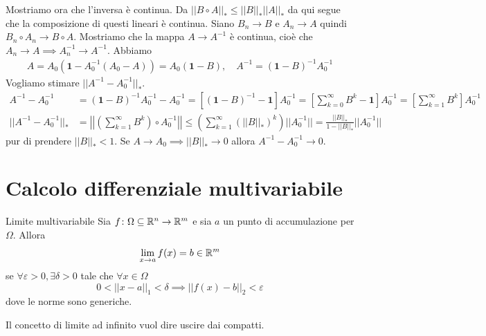 \documentclass[a4paper]{article}
\begin{document}
\begin{snippetproof}{}
    Mostriamo ora che l'inversa è continua.
    Da \(||B\circ A||_* \leq ||B||_* ||A||_*\)
    da qui segue che la composizione di questi lineari è continua.
    Siano \(B_n \to B\) e \(A_n \to A\) quindi \(B_n \circ A_n \to B\circ A\).
    Mostriamo che la mappa \(A \to A^{-1}\) è continua, cioè che
    \(A_n \to A \implies A_n^{-1} \to A^{-1}\). Abbiamo
    \begin{align*}
        A = A_0(\mathbf{1} - A_0^{-1}(A_0 - A)) = A_0(\mathbf{1} - B), \quad A^{-1} = (\mathbf{1} - B)^{-1} A_0^{-1}
    \end{align*}
    Vogliamo stimare \(||A^{-1} - A_0^{-1}||_*\).
    \begin{align*}
        A^{-1} - A_0^{-1} &=
        {(\mathbf{1} - B)}^{-1} A_0^{-1} - A_0^{-1}
        = \left[
            {(\mathbf{1} - B)}^{-1} - \mathbf{1}
        \right]A_0^{-1} = \left[
            \sum_{k=0}^\infty B^k - \mathbf{1}
        \right]A_0^{-1} = \left[\sum_{k=1}^\infty B^k\right] A_0^{-1} \\
        ||A^{-1} - A_0^{-1}||_*
        &= \left|\left| \left(\sum_{k=1}^\infty B^k\right) \circ A_0^{-1}
        \right|\right|
        \leq \left(\sum_{k=1}^\infty {(||B||_*)}^k\right) ||A_0^{-1}||
        = \frac{||B||_*}{1 - ||B||_*} ||A_0^{-1} ||
    \end{align*}
    pur di prendere \(||B||_* < 1\).
    Se \(A \to A_0 \implies ||B||_* \to 0\) allora \( A^{-1} - A_0^{-1} \to 0\).
\end{snippetproof}

\pagebreak

\section{Calcolo differenziale multivariabile}

\begin{radioactive}
\begin{snippetdefinition}{Limite multivariabile}
    Sia \(f \colon \Omega \subseteq \mathbb{R}^n \to \mathbb{R}^m\)
    e sia \(a\) un punto di accumulazione per \(\Omega\).
    Allora
    \[
        \lim_{x\to a} f(x) = b \in \mathbb{R}^m
    \]
    se \(\forall \varepsilon > 0, \exists \delta > 0\)
    tale che \(\forall x \in \Omega\)
    \[
        0 < ||x-a||_1 < \delta
        \implies
        ||f(x) - b||_2 < \varepsilon
    \]
    dove le norme sono generiche.
\end{snippetdefinition}

Il concetto di limite ad infinito vuol dire uscire dai compatti.
\end{radioactive}
\end{document}
